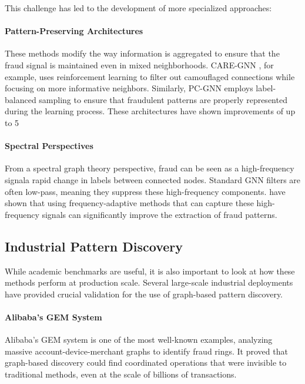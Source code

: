 This challenge has led to the development of more specialized approaches:

\paragraph{Pattern-Preserving Architectures}
These methods modify the way information is aggregated to ensure that the fraud signal is maintained even in mixed neighborhoods. CARE-GNN \cite{dou2020enhancing}, for example, uses reinforcement learning to filter out camouflaged connections while focusing on more informative neighbors. Similarly, PC-GNN \cite{liu2021heterogeneous} employs label-balanced sampling to ensure that fraudulent patterns are properly represented during the learning process. These architectures have shown improvements of up to 5%

\paragraph{Spectral Perspectives}
From a spectral graph theory perspective, fraud can be seen as a high-frequency signala rapid change in labels between connected nodes. Standard GNN filters are often low-pass, meaning they suppress these high-frequency components. \citeauthor{tang2022rethinking} \cite{tang2022rethinking} have shown that using frequency-adaptive methods that can capture these high-frequency signals can significantly improve the extraction of fraud patterns.

\subsection{Industrial Pattern Discovery}

While academic benchmarks are useful, it is also important to look at how these methods perform at production scale. Several large-scale industrial deployments have provided crucial validation for the use of graph-based pattern discovery.

\paragraph{Alibaba's GEM System}
Alibaba's GEM system \cite{liu2018heterogeneous} is one of the most well-known examples, analyzing massive account-device-merchant graphs to identify fraud rings. It proved that graph-based discovery could find coordinated operations that were invisible to traditional methods, even at the scale of billions of transactions.

